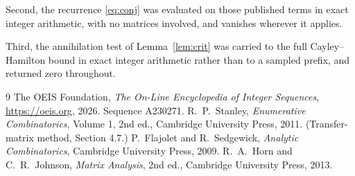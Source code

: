 \documentclass[11pt,a4paper]{article}
\theoremstyle{plain}
\theoremstyle{definition}
\begin{document}
Second, the recurrence \eqref{eq:conj} was evaluated on those published terms in exact
integer arithmetic, with no matrices involved, and vanishes wherever it applies.

Third, the annihilation test of Lemma~\ref{lem:crit} was carried to the full
Cayley--Hamilton bound in exact integer arithmetic rather than to a sampled prefix, and
returned zero throughout.

\begin{thebibliography}{9}
 The OEIS Foundation, \emph{The On-Line Encyclopedia of Integer
Sequences}, \url{https://oeis.org}, 2026. Sequence A230271.
 R.~P.~Stanley, \emph{Enumerative Combinatorics}, Volume 1, 2nd ed.,
Cambridge University Press, 2011. (Transfer-matrix method, Section 4.7.)
 P.~Flajolet and R.~Sedgewick, \emph{Analytic Combinatorics}, Cambridge
University Press, 2009.
 R.~A.~Horn and C.~R.~Johnson, \emph{Matrix Analysis}, 2nd ed., Cambridge
University Press, 2013.
\end{thebibliography}
\end{document}
